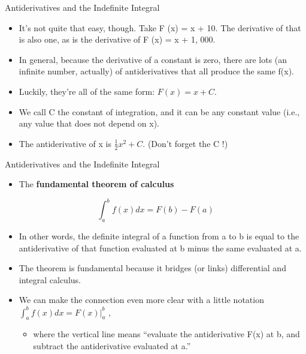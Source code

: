 \documentclass[
  ignorenonframetext,
]{beamer}
\providecommand{\tightlist}{%
  \setlength{\itemsep}{0pt}\setlength{\parskip}{0pt}}
\begin{document}
\begin{frame}{Antiderivatives and the Indefinite Integral}
\protect\hypertarget{antiderivatives-and-the-indefinite-integral-1}{}

\begin{itemize}
\item
  It's not quite that easy, though. Take F (x) = x + 10. The derivative
  of that is also one, as is the derivative of F (x) = x + 1, 000.
\item
  In general, because the derivative of a constant is zero, there are
  lots (an infinite number, actually) of antiderivatives that all
  produce the same f(x).
\item
  Luckily, they're all of the same form: \(F(x) = x + C\).
\item
  We call C the constant of integration, and it can be any constant
  value (i.e., any value that does not depend on x).
\item
  The antiderivative of x is \(\frac{1}{2}x^2 + C\). (Don't forget the C
  !)
\end{itemize}

\end{frame}

\begin{frame}{Antiderivatives and the Indefinite Integral}
\protect\hypertarget{antiderivatives-and-the-indefinite-integral-2}{}

\begin{itemize}
\tightlist
\item
  The \textbf{fundamental theorem of calculus}
\end{itemize}

\[\int_{a}^{b}f(x)dx = F(b) - F(a)\]

\begin{itemize}
\item
  In other words, the definite integral of a function from a to b is
  equal to the antiderivative of that function evaluated at b minus the
  same evaluated at a.
\item
  The theorem is fundamental because it bridges (or links) differential
  and integral calculus.
\item
  We can make the connection even more clear with a little notation
  \(\int_{a}^{b}f(x)dx = \left. F(x) \right|_{a}^{b}\) ,

  \begin{itemize}
  \tightlist
  \item
    where the vertical line means ``evaluate the antiderivative F(x) at
    b, and subtract the antiderivative evaluated at a.''
  \end{itemize}
\end{itemize}

\end{frame}
\end{document}
